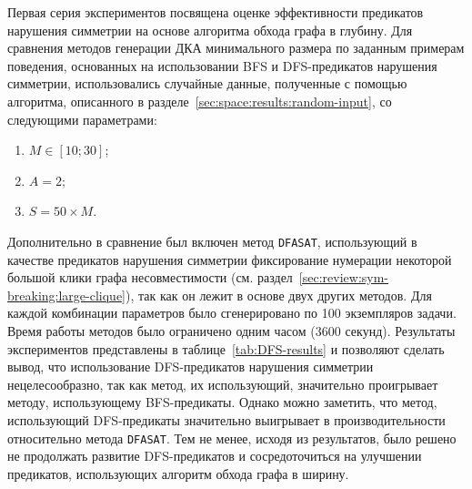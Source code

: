 Первая серия экспериментов посвящена оценке эффективности предикатов нарушения симметрии на основе алгоритма обхода графа в глубину.
Для сравнения методов генерации ДКА минимального размера по заданным примерам поведения, основанных на использовании BFS и DFS-предикатов нарушения симметрии, использовались случайные данные, полученные с помощью алгоритма, описанного в разделе~\ref{sec:space:results:random-input}, со следующими параметрами:
\begin{enumerate}
  \item $M \in \left[10;30\right]$;
  \item $A = 2$;
  \item $S = 50 \times M$.
\end{enumerate}

Дополнительно в сравнение был включен метод \texttt{DFASAT}, использующий в качестве предикатов нарушения симметрии фиксирование нумерации некоторой большой клики графа несовместимости (см. раздел~\ref{sec:review:sym-breaking:large-clique}), так как он лежит в основе двух других методов.
Для каждой комбинации параметров было сгенерировано по 100 экземпляров задачи.
Время работы методов было ограничено одним часом (3600 секунд).
Результаты экспериментов представлены в таблице~\ref{tab:DFS-results} и позволяют сделать вывод, что использование DFS-предикатов нарушения симметрии нецелесообразно, так как метод, их использующий, значительно проигрывает методу, использующему BFS-предикаты.
Однако можно заметить, что метод, использующий DFS-предикаты значительно выигрывает в производительности относительно метода \texttt{DFASAT}.
Тем не менее, исходя из результатов, было решено не продолжать развитие DFS-предикатов и сосредоточиться на улучшении предикатов, использующих алгоритм обхода графа в ширину.

